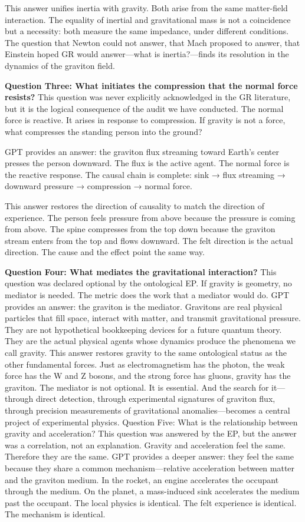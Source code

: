 \documentclass[11pt]{article}
\begin{document}
This answer unifies inertia with gravity. Both arise from the same matter-field interaction. The equality of inertial and gravitational mass is not a coincidence but a necessity: both measure the same impedance, under different conditions. The question that Newton could not answer, that Mach proposed to answer, that Einstein hoped GR would answer---what is inertia?---finds its resolution in the dynamics of the graviton field.

\textbf{Question Three: What initiates the compression that the normal force resists?} This question was never explicitly acknowledged in the GR literature, but it is the logical consequence of the audit we have conducted. The normal force is reactive. It arises in response to compression. If gravity is not a force, what compresses the standing person into the ground?

GPT provides an answer: the graviton flux streaming toward Earth's center presses the person downward. The flux is the active agent. The normal force is the reactive response. The causal chain is complete: sink → flux streaming → downward pressure → compression → normal force.

This answer restores the direction of causality to match the direction of experience. The person feels pressure from above because the pressure is coming from above. The spine compresses from the top down because the graviton stream enters from the top and flows downward. The felt direction is the actual direction. The cause and the effect point the same way.

\textbf{Question Four: What mediates the gravitational interaction?} This question was declared optional by the ontological EP. If gravity is geometry, no mediator is needed. The metric does the work that a mediator would do. GPT provides an answer: the graviton is the mediator. Gravitons are real physical particles that fill space, interact with matter, and transmit gravitational pressure. They are not hypothetical bookkeeping devices for a future quantum theory. They are the actual physical agents whose dynamics produce the phenomena we call gravity. This answer restores gravity to the same ontological status as the other fundamental forces. Just as electromagnetism has the photon, the weak force has the W and Z bosons, and the strong force has gluons, gravity has the graviton. The mediator is not optional. It is essential. And the search for it---through direct detection, through experimental signatures of graviton flux, through precision measurements of gravitational anomalies---becomes a central project of experimental physics. Question Five: What is the relationship between gravity and acceleration? This question was answered by the EP, but the answer was a correlation, not an explanation. Gravity and acceleration feel the same. Therefore they are the same. GPT provides a deeper answer: they feel the same because they share a common mechanism---relative acceleration between matter and the graviton medium. In the rocket, an engine accelerates the occupant through the medium. On the planet, a mass-induced sink accelerates the medium past the occupant. The local physics is identical. The felt experience is identical. The mechanism is identical.
\end{document}
